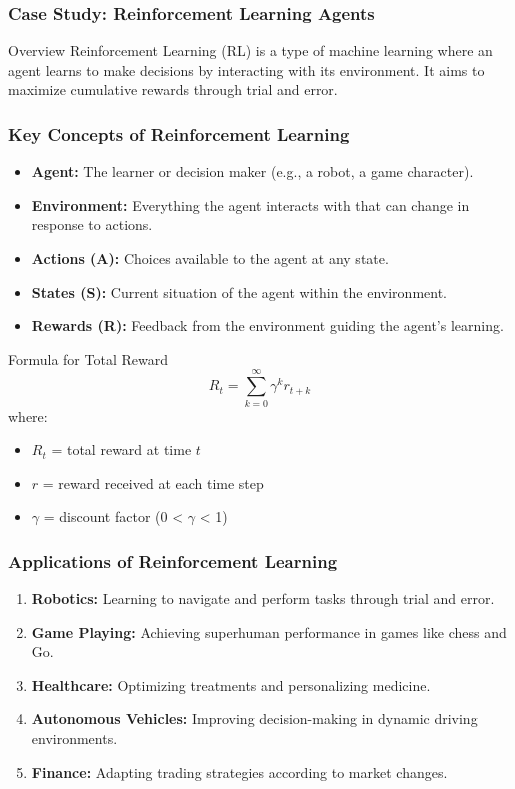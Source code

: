 \documentclass[aspectratio=169]{beamer}
\begin{document}
\begin{frame}[fragile]
    \frametitle{Case Study: Reinforcement Learning Agents}
    \begin{block}{Overview}
        Reinforcement Learning (RL) is a type of machine learning where an agent learns to make decisions by interacting with its environment. It aims to maximize cumulative rewards through trial and error.
    \end{block}
\end{frame}

\begin{frame}[fragile]
    \frametitle{Key Concepts of Reinforcement Learning}
    \begin{itemize}
        \item \textbf{Agent:} The learner or decision maker (e.g., a robot, a game character).
        \item \textbf{Environment:} Everything the agent interacts with that can change in response to actions.
        \item \textbf{Actions (A):} Choices available to the agent at any state.
        \item \textbf{States (S):} Current situation of the agent within the environment.
        \item \textbf{Rewards (R):} Feedback from the environment guiding the agent's learning.
    \end{itemize}
    \begin{block}{Formula for Total Reward}
        \begin{equation}
            R_t = \sum_{k=0}^{\infty} \gamma^k r_{t+k}
        \end{equation}
        where:
        \begin{itemize}
            \item \(R_t\) = total reward at time \(t\)
            \item \(r\) = reward received at each time step
            \item \(\gamma\) = discount factor (0 < \(\gamma\) < 1)
        \end{itemize}
    \end{block}
\end{frame}

\begin{frame}[fragile]
    \frametitle{Applications of Reinforcement Learning}
    \begin{enumerate}
        \item \textbf{Robotics:} Learning to navigate and perform tasks through trial and error.
        \item \textbf{Game Playing:} Achieving superhuman performance in games like chess and Go.
        \item \textbf{Healthcare:} Optimizing treatments and personalizing medicine.
        \item \textbf{Autonomous Vehicles:} Improving decision-making in dynamic driving environments.
        \item \textbf{Finance:} Adapting trading strategies according to market changes.
    \end{enumerate}
\end{frame}
\end{document}
